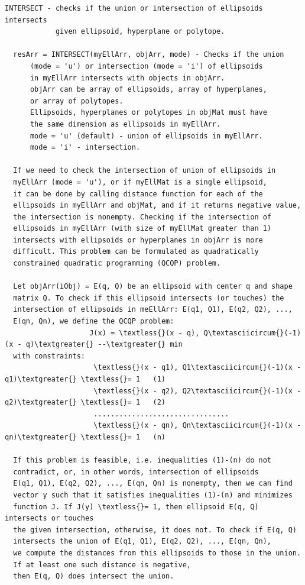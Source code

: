 \documentclass[letterpaper,10pt,english]{sphinxmanual}
\begin{document}
\begin{Verbatim}[commandchars=\\\{\}]
INTERSECT - checks if the union or intersection of ellipsoids intersects
            given ellipsoid, hyperplane or polytope.

  resArr = INTERSECT(myEllArr, objArr, mode) - Checks if the union
      (mode = 'u') or intersection (mode = 'i') of ellipsoids
      in myEllArr intersects with objects in objArr.
      objArr can be array of ellipsoids, array of hyperplanes,
      or array of polytopes.
      Ellipsoids, hyperplanes or polytopes in objMat must have
      the same dimension as ellipsoids in myEllArr.
      mode = 'u' (default) - union of ellipsoids in myEllArr.
      mode = 'i' - intersection.

  If we need to check the intersection of union of ellipsoids in
  myEllArr (mode = 'u'), or if myEllMat is a single ellipsoid,
  it can be done by calling distance function for each of the
  ellipsoids in myEllArr and objMat, and if it returns negative value,
  the intersection is nonempty. Checking if the intersection of
  ellipsoids in myEllArr (with size of myEllMat greater than 1)
  intersects with ellipsoids or hyperplanes in objArr is more
  difficult. This problem can be formulated as quadratically
  constrained quadratic programming (QCQP) problem.

  Let objArr(iObj) = E(q, Q) be an ellipsoid with center q and shape
  matrix Q. To check if this ellipsoid intersects (or touches) the
  intersection of ellipsoids in meEllArr: E(q1, Q1), E(q2, Q2), ...,
  E(qn, Qn), we define the QCQP problem:
                    J(x) = \textless{}(x - q), Q\textasciicircum{}(-1)(x - q)\textgreater{} --\textgreater{} min
  with constraints:
                     \textless{}(x - q1), Q1\textasciicircum{}(-1)(x - q1)\textgreater{} \textless{}= 1   (1)
                     \textless{}(x - q2), Q2\textasciicircum{}(-1)(x - q2)\textgreater{} \textless{}= 1   (2)
                     ................................
                     \textless{}(x - qn), Qn\textasciicircum{}(-1)(x - qn)\textgreater{} \textless{}= 1   (n)

  If this problem is feasible, i.e. inequalities (1)-(n) do not
  contradict, or, in other words, intersection of ellipsoids
  E(q1, Q1), E(q2, Q2), ..., E(qn, Qn) is nonempty, then we can find
  vector y such that it satisfies inequalities (1)-(n) and minimizes
  function J. If J(y) \textless{}= 1, then ellipsoid E(q, Q) intersects or touches
  the given intersection, otherwise, it does not. To check if E(q, Q)
  intersects the union of E(q1, Q1), E(q2, Q2), ..., E(qn, Qn),
  we compute the distances from this ellipsoids to those in the union.
  If at least one such distance is negative,
  then E(q, Q) does intersect the union.


\end{Verbatim}
\end{document}
